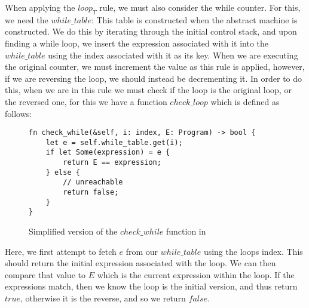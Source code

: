 When applying the $loop_T$ rule, we must also consider the while counter. For this, we need the $while\_table$: This table is constructed when the abstract machine is constructed. We do this by iterating through the initial control stack, and upon finding a while loop, we insert the expression associated with it into the $while\_table$ using the index associated with it as its key.
When we are executing the original counter, we must increment the value as this rule is applied, however, if we are reversing the loop, we should instead be decrementing it. In order to do this, when we are in this rule we must check if the loop is the original loop, or the reversed one, for this we have a function $check\_loop$ which is defined as follows:

\begin{figure}
    \centering
    \begin{lstlisting}
fn check_while(&self, i: index, E: Program) -> bool {
    let e = self.while_table.get(i);
    if let Some(expression) = e {
        return E == expression;
    } else {
        // unreachable
        return false;
    }
}
    \end{lstlisting}
    \caption{Simplified version of the $check\_while$ function in \rimp}
    \label{fig:check_while}
\end{figure}

Here, we first attempt to fetch $e$ from our $while\_table$ using the loops index. This should return the initial expression associated with the loop. We can then compare that value to $E$ which is the current expression within the loop. If the expressions match, then we know the loop is the initial version, and thus return $true$, otherwise it is the reverse, and so we return $false$. 